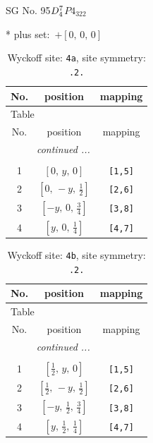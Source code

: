 \documentclass[fleqn,8pt]{jsarticle}
\begin{document}
\setcounter{MaxMatrixCols}{32}

\renewcommand{\tablename}{Table~}
\renewcommand{\figurename}{Figure~}
\begin{center}
\LARGE
SG No. 95\quad$D_{\rm 4}^{7}$\quad$P4_322$\quad[ tetragonal ]
\end{center}
* plus set:\,\,\,$+\left[ 0,\, 0,\, 0 \right]$
\renewcommand{\arraystretch}{1.2}
\begin{longtable}{ccc}
\caption{Wyckoff site: {\tt 4a}, site symmetry: {\tt .2.}}
 \\
 \hline \hline
No. & position & mapping \\ \hline \endfirsthead

\multicolumn{2}{l}{\tablename\ \thetable{}} \\
 \hline \hline
No. & position & mapping \\ \hline \endhead

 \hline \hline
\multicolumn{2}{r}{\footnotesize\it continued ...} \\ \endfoot

 \hline \hline
\multicolumn{2}{r}{} \\ \endlastfoot

1 & $\left[ 0,\, y,\, 0 \right]$ & {\tt [1,5]} \\ \hline
2 & $\left[ 0,\, - y,\, \frac{1}{2} \right]$ & {\tt [2,6]} \\ \hline
3 & $\left[ - y,\, 0,\, \frac{3}{4} \right]$ & {\tt [3,8]} \\ \hline
4 & $\left[ y,\, 0,\, \frac{1}{4} \right]$ & {\tt [4,7]} \\
\end{longtable}
\renewcommand{\arraystretch}{1.2}
\begin{longtable}{ccc}
\caption{Wyckoff site: {\tt 4b}, site symmetry: {\tt .2.}}
 \\
 \hline \hline
No. & position & mapping \\ \hline \endfirsthead

\multicolumn{2}{l}{\tablename\ \thetable{}} \\
 \hline \hline
No. & position & mapping \\ \hline \endhead

 \hline \hline
\multicolumn{2}{r}{\footnotesize\it continued ...} \\ \endfoot

 \hline \hline
\multicolumn{2}{r}{} \\ \endlastfoot

1 & $\left[ \frac{1}{2},\, y,\, 0 \right]$ & {\tt [1,5]} \\ \hline
2 & $\left[ \frac{1}{2},\, - y,\, \frac{1}{2} \right]$ & {\tt [2,6]} \\ \hline
3 & $\left[ - y,\, \frac{1}{2},\, \frac{3}{4} \right]$ & {\tt [3,8]} \\ \hline
4 & $\left[ y,\, \frac{1}{2},\, \frac{1}{4} \right]$ & {\tt [4,7]} \\
\end{longtable}
\end{document}
